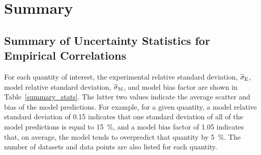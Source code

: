 
\chapter{Summary}
\label{Summary_Chapter}

\section*{Summary of Uncertainty Statistics for Empirical Correlations}

For each quantity of interest, the experimental relative standard deviation, $\widetilde{\sigma}\sb{E}$, model relative standard deviation, $\widetilde{\sigma}\sb{M}$, and model bias factor are shown in Table~\ref{summary_stats}. The latter two values indicate the average scatter and bias of the model predictions. For example, for a given quantity, a model relative standard deviation of 0.15 indicates that one standard deviation of all of the model predictions is equal to 15~\%, and a model bias factor of 1.05 indicates that, on average, the model tends to overpredict that quantity by 5~\%. The number of datasets and data points are also listed for each quantity.

